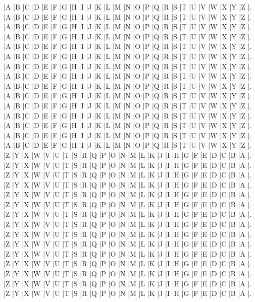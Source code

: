 \documentclass[10pt]{article}
\begin{document}
\PuzzleSolution
\begin{Puzzle}{10}{26}
|A |B |C |D |E |F |G |H |I |J |K |L |M |N |O |P |Q |R |S |T |U |V |W |X |Y |Z |.
|A |B |C |D |E |F |G |H |I |J |K |L |M |N |O |P |Q |R |S |T |U |V |W |X |Y |Z |.
|A |B |C |D |E |F |G |H |I |J |K |L |M |N |O |P |Q |R |S |T |U |V |W |X |Y |Z |.
|A |B |C |D |E |F |G |H |I |J |K |L |M |N |O |P |Q |R |S |T |U |V |W |X |Y |Z |.
|A |B |C |D |E |F |G |H |I |J |K |L |M |N |O |P |Q |R |S |T |U |V |W |X |Y |Z |.
|A |B |C |D |E |F |G |H |I |J |K |L |M |N |O |P |Q |R |S |T |U |V |W |X |Y |Z |.
|A |B |C |D |E |F |G |H |I |J |K |L |M |N |O |P |Q |R |S |T |U |V |W |X |Y |Z |.
|A |B |C |D |E |F |G |H |I |J |K |L |M |N |O |P |Q |R |S |T |U |V |W |X |Y |Z |.
|A |B |C |D |E |F |G |H |I |J |K |L |M |N |O |P |Q |R |S |T |U |V |W |X |Y |Z |.
|A |B |C |D |E |F |G |H |I |J |K |L |M |N |O |P |Q |R |S |T |U |V |W |X |Y |Z |.
|A |B |C |D |E |F |G |H |I |J |K |L |M |N |O |P |Q |R |S |T |U |V |W |X |Y |Z |.
|A |B |C |D |E |F |G |H |I |J |K |L |M |N |O |P |Q |R |S |T |U |V |W |X |Y |Z |.
|A |B |C |D |E |F |G |H |I |J |K |L |M |N |O |P |Q |R |S |T |U |V |W |X |Y |Z |.
|A |B |C |D |E |F |G |H |I |J |K |L |M |N |O |P |Q |R |S |T |U |V |W |X |Y |Z |.
|A |B |C |D |E |F |G |H |I |J |K |L |M |N |O |P |Q |R |S |T |U |V |W |X |Y |Z |.
|Z |Y |X |W |V |U |T |S |R |Q |P |O |N |M |L |K |J |I |H |G |F |E |D |C |B |A |.
|Z |Y |X |W |V |U |T |S |R |Q |P |O |N |M |L |K |J |I |H |G |F |E |D |C |B |A |.
|Z |Y |X |W |V |U |T |S |R |Q |P |O |N |M |L |K |J |I |H |G |F |E |D |C |B |A |.
|Z |Y |X |W |V |U |T |S |R |Q |P |O |N |M |L |K |J |I |H |G |F |E |D |C |B |A |.
|Z |Y |X |W |V |U |T |S |R |Q |P |O |N |M |L |K |J |I |H |G |F |E |D |C |B |A |.
|Z |Y |X |W |V |U |T |S |R |Q |P |O |N |M |L |K |J |I |H |G |F |E |D |C |B |A |.
|Z |Y |X |W |V |U |T |S |R |Q |P |O |N |M |L |K |J |I |H |G |F |E |D |C |B |A |.
|Z |Y |X |W |V |U |T |S |R |Q |P |O |N |M |L |K |J |I |H |G |F |E |D |C |B |A |.
|Z |Y |X |W |V |U |T |S |R |Q |P |O |N |M |L |K |J |I |H |G |F |E |D |C |B |A |.
|Z |Y |X |W |V |U |T |S |R |Q |P |O |N |M |L |K |J |I |H |G |F |E |D |C |B |A |.
|Z |Y |X |W |V |U |T |S |R |Q |P |O |N |M |L |K |J |I |H |G |F |E |D |C |B |A |.
|Z |Y |X |W |V |U |T |S |R |Q |P |O |N |M |L |K |J |I |H |G |F |E |D |C |B |A |.
|Z |Y |X |W |V |U |T |S |R |Q |P |O |N |M |L |K |J |I |H |G |F |E |D |C |B |A |.
|Z |Y |X |W |V |U |T |S |R |Q |P |O |N |M |L |K |J |I |H |G |F |E |D |C |B |A |.
|Z |Y |X |W |V |U |T |S |R |Q |P |O |N |M |L |K |J |I |H |G |F |E |D |C |B |A |.
\end{Puzzle}
\end{document}
